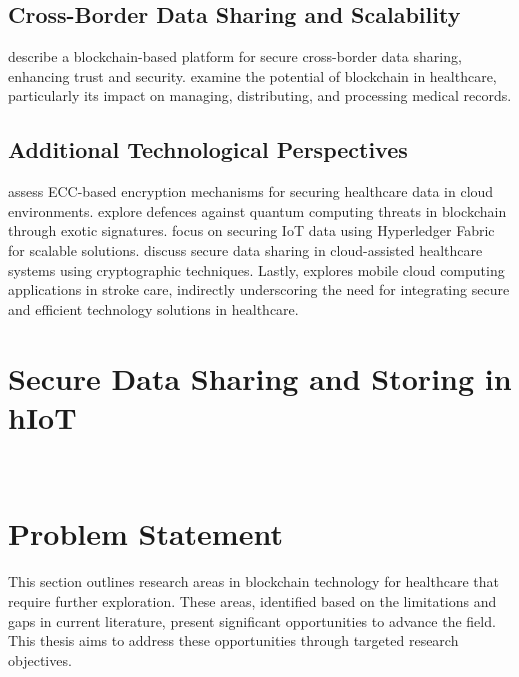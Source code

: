 \documentclass[cic,tc,english]{iiufrgs}
\begin{document}
        \subsection{Cross-Border Data Sharing and Scalability} 
            \citet{Rahman2020} describe a blockchain-based platform for secure cross-border data sharing, enhancing trust and security. \citet{Saeed2022} examine the potential of blockchain in healthcare, particularly its impact on managing, distributing, and processing medical records.
        
        \subsection{Additional Technological Perspectives} 
            \citet{Hema2019} assess ECC-based encryption mechanisms for securing healthcare data in cloud environments. \citet{Naz2024} explore defences against quantum computing threats in blockchain through exotic signatures. \citet{Eghmazi2024} focus on securing IoT data using Hyperledger Fabric for scalable solutions. \citet{XuChang2019} discuss secure data sharing in cloud-assisted healthcare systems using cryptographic techniques. Lastly, \citet{Karaca2019} explores mobile cloud computing applications in stroke care, indirectly underscoring the need for integrating secure and efficient technology solutions in healthcare.

    

    \section{Secure Data Sharing and Storing in hIoT}
        \label{sec:securedata}\

    \section{Problem Statement}
        \label{sec:problemstatement}

        This section outlines research areas in blockchain technology for healthcare that require further exploration. These areas, identified based on the limitations and gaps in current literature, present significant opportunities to advance the field. This thesis aims to address these opportunities through targeted research objectives.
\end{document}
